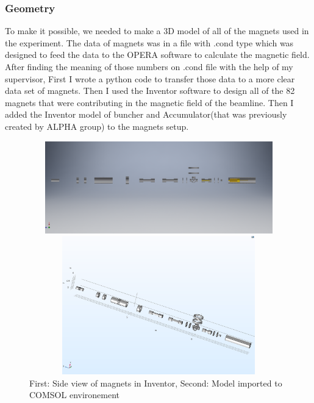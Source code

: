 \documentclass[12pt,a4paper]{article}
\begin{document}
\subsubsection{Geometry}
To make it possible, we needed to make a 3D model of all of the magnets used in the experiment. The data of magnets was in a file with .cond type which was designed to feed the data to the OPERA software to calculate the magnetic field. After finding the meaning of those numbers on .cond file with the help of my supervisor, First I wrote a python code to transfer those data to a more clear data set of magnets. Then I used the Inventor software to design all of the 82 magnets that were contributing in the magnetic field of the beamline. Then I added the Inventor model of buncher and Accumulator(that was previously created by ALPHA group) to the magnets setup.

\begin{figure}[h]
\centering

\includegraphics[width=120mm,
height=40mm]{full-beam-line-half}

\includegraphics[width=120mm, height=60mm]{full-comsol}
\caption{First: Side view of magnets in Inventor, Second: Model imported to COMSOL environement }
\end{figure}
\end{document}
